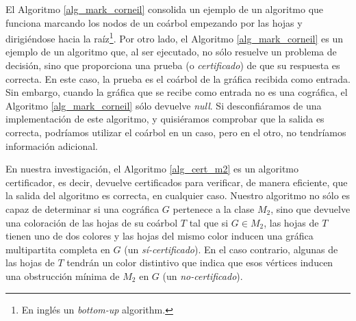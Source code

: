 El Algoritmo \ref{alg_mark_corneil} consolida un ejemplo
de un algoritmo que funciona marcando los nodos de un coárbol
empezando por las hojas y dirigiéndose hacia la raíz\footnote{En
ingl\'es un {\em bottom-up} algorithm.}. Por otro lado, el Algoritmo
\ref{alg_mark_corneil} es un ejemplo de un algoritmo que, al ser
ejecutado, no sólo resuelve un problema de decisión, sino que
proporciona una prueba (o {\em certificado}) de que su respuesta
es correcta. En este caso, la prueba es el coárbol de la
gráfica recibida como entrada. Sin embargo, cuando la gr\'afica
que se recibe como entrada no es una cogr\'afica, el Algoritmo
\ref{alg_mark_corneil} s\'olo devuelve {\em null}. Si desconfi\'aramos
de una implementaci\'on de este algoritmo, y quisi\'eramos comprobar
que la salida es correcta, podr\'iamos utilizar el co\'arbol en un
caso, pero en el otro, no tendr\'iamos informaci\'on adicional.

En nuestra investigación, el Algoritmo \ref{alg_cert_m2} es un
algoritmo certificador, es decir, devuelve certificados para
verificar, de manera eficiente, que la salida del algoritmo es
correcta, en cualquier caso. Nuestro algoritmo no sólo es capaz de
determinar si una cográfica $G$ pertenece a la clase $M_2$, sino que
devuelve una coloración de las hojas de su coárbol $T$ tal que si
$G \in M_2$, las hojas de $T$ tienen uno de dos colores y las hojas
del mismo color inducen una gráfica multipartita completa en $G$
(un {\em s\'i-certificado}). En el caso contrario, algunas de las
hojas de $T$ tendrán un color distintivo que indica que esos
vértices inducen una obstrucción mínima de $M_2$ en $G$ (un
{\em no-certificado}).
